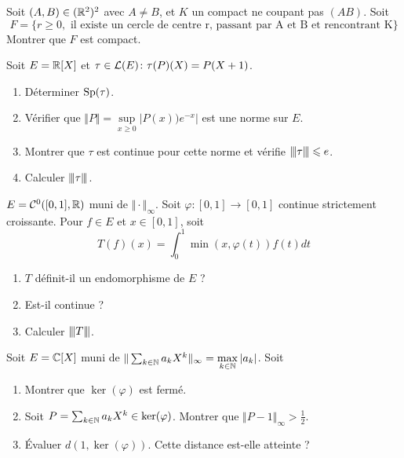 \begin{exercise}
	Soit $(A,B)\in(\mathbb{R}^{2})^{2}$ avec $A\neq B$, et $K$ un compact ne coupant pas $(AB)$. Soit 
	$$F=\{r\geqslant0,\text{ il existe un cercle de centre r, passant par A et B et rencontrant K}\}$$
	Montrer que $F$ est compact.
\end{exercise}

\begin{exercise}
	Soit $E=\mathbb{R}[X]$ et $\tau\in\mathcal{L}(E)\colon\tau(P)(X)=P(X+1)$.
	\begin{enumerate}
		\item Déterminer $\operatorname{Sp}(\tau)$.
		\item Vérifier que $\Vert P\Vert=\sup\limits_{x\geqslant0}\vert P(x))e^{-x}\vert$ est une norme sur $E$.
		\item Montrer que $\tau$ est continue pour cette norme et vérifie ${\left\vert\kern-0.25ex\left\vert\kern-0.25ex\left\vert{}\tau \right\vert\kern-0.25ex\right\vert\kern-0.25ex\right\vert}\leqslant e$.
		\item Calculer ${\left\vert\kern-0.25ex\left\vert\kern-0.25ex\left\vert{}\tau \right\vert\kern-0.25ex\right\vert\kern-0.25ex\right\vert}$.
	\end{enumerate}
\end{exercise}

\begin{exercise}
	$E=\mathcal{C}^{0}([0,1],\mathbb{R})$ muni de $\Vert\cdot\Vert_{\infty}$. Soit $\varphi\colon[0,1]\to[0,1]$ continue strictement croissante. Pour $f\in E$ et $x\in[0,1]$, soit 
	$$T(f)(x)=\int_{0}^{1}\min(x,\varphi(t))f(t)dt$$
	\begin{enumerate}
		\item $T$ définit-il un endomorphisme de $E$ ?
		\item Est-il continue ?
		\item Calculer ${\left\vert\kern-0.25ex\left\vert\kern-0.25ex\left\vert{}T \right\vert\kern-0.25ex\right\vert\kern-0.25ex\right\vert}$.
	\end{enumerate}
\end{exercise}

\begin{exercise}
	Soit $E=\mathbb{C}[X]$ muni de $\Vert\sum_{k\in\mathbb{N}} a_{k}X^{k}\Vert_{\infty}=\max\limits_{k\in\mathbb{N}}\vert a_{k}\vert$. Soit 
	\phantom{}
	\begin{enumerate}
		\item Montrer que $\ker(\varphi)$ est fermé.
		\item Soit $P=\sum_{k\in\mathbb{N}}a_{k}X^{k}\in\ker(\varphi)$. Montrer que $\Vert P-1\Vert_{\infty}>\frac{1}{2}$.
		\item Évaluer $d(1,\ker(\varphi))$. Cette distance est-elle atteinte ?
	\end{enumerate}
\end{exercise}

